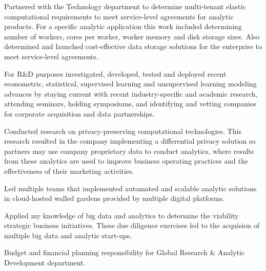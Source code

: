 \begin{zitemize}
\vspace{0.2em}
\item Partnered with the Technology department to determine multi-tenant elastic computational requirements to meet service-level agreements for analytic products. For a specific analytic application this work included determining number of workers, cores per worker, worker memory and disk storage sizes.  Also determined and launched cost-effective data storage solutions for the enterprise to meet service-level agreements. 
\newpage

\item For R\&D purposes investigated, developed, tested and deployed recent econometric, statistical, supervised learning and unsupervised learning modeling advances  %
by staying current with recent industry-specific and academic research, attending seminars, holding symposiums, and identifying and vetting companies  for corporate acquisition and data partnerships.  
\item Conducted research on privacy-preserving computational technologies.  This research resulted in the company implementing a differential privacy solution so partners may use company proprietary data to conduct analytics, where results from these analytics are used to improve business operating practices and the effectiveness of their marketing activities.
\vspace{0.2em}
\item Led multiple teams that implemented automated and scalable analytic solutions in cloud-hosted walled gardens provided by multiple digital platforms. 
\item Applied my knowledge of big data and analytics to determine 
the viability strategic business initiatives.  These due diligence exercises led to the acquision of multiple big data and analytic start-ups. 
\vspace{0.2em}
\item  Budget and financial planning responsibility for Global Research \& Analytic Development department. 
\end{zitemize}

